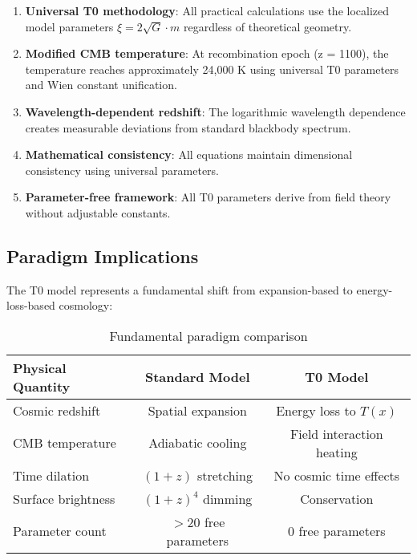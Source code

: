 \documentclass[12pt,a4paper]{article}
\newcommand{\Tfield}{T(x)}
\begin{document}
	\begin{enumerate}
		\item \textbf{Universal T0 methodology}: All practical calculations use the localized model parameters $\xi = 2\sqrt{G} \cdot m$ regardless of theoretical geometry.
		
		\item \textbf{Modified CMB temperature}: At recombination epoch (z = 1100), the temperature reaches approximately 24,000 K using universal T0 parameters and Wien constant unification.
		
		\item \textbf{Wavelength-dependent redshift}: The logarithmic wavelength dependence creates measurable deviations from standard blackbody spectrum.
		
		\item \textbf{Mathematical consistency}: All equations maintain dimensional consistency using universal parameters.
		
		\item \textbf{Parameter-free framework}: All T0 parameters derive from field theory without adjustable constants.
	\end{enumerate}
	
	\subsection{Paradigm Implications}
	\label{subsec:paradigm_implications}
	
	The T0 model represents a fundamental shift from expansion-based to energy-loss-based cosmology:
	
	\begin{table}[htbp]
		\centering
		\begin{tabular}{|l|c|c|}
			\hline
			\textbf{Physical Quantity} & \textbf{Standard Model} & \textbf{T0 Model} \\
			\hline
			Cosmic redshift & Spatial expansion & Energy loss to $\Tfield$ \\
			CMB temperature & Adiabatic cooling & Field interaction heating \\
			Time dilation & $(1+z)$ stretching & No cosmic time effects \\
			Surface brightness & $(1+z)^4$ dimming & Conservation \\
			Parameter count & $>20$ free parameters & 0 free parameters \\
			\hline
		\end{tabular}
		\caption{Fundamental paradigm comparison}
		\label{tab:paradigm_comparison}
	\end{table}
	
\end{document}
